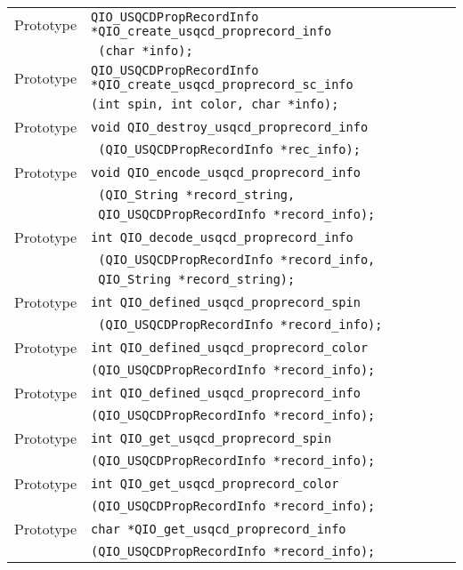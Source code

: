 \documentclass{article}
\begin{document}
\begin{flushleft}
  \begin{tabular}{|l|l|}
  \hline
  Prototype      & \verb|QIO_USQCDPropRecordInfo *QIO_create_usqcd_proprecord_info|\\
                 & \verb| (char *info);|\\
  Prototype      & \verb|QIO_USQCDPropRecordInfo *QIO_create_usqcd_proprecord_sc_info|\\
                 & \verb|(int spin, int color, char *info);|\\
  Prototype      & \verb|void QIO_destroy_usqcd_proprecord_info|\\
               & \verb| (QIO_USQCDPropRecordInfo *rec_info);|\\
Prototype      & \verb|void QIO_encode_usqcd_proprecord_info|\\
               & \verb| (QIO_String *record_string, |\\
               & \verb| QIO_USQCDPropRecordInfo *record_info);|\\
Prototype      & \verb|int QIO_decode_usqcd_proprecord_info|\\
               & \verb| (QIO_USQCDPropRecordInfo *record_info,|\\
               & \verb| QIO_String *record_string);|\\
Prototype      & \verb|int QIO_defined_usqcd_proprecord_spin|\\
               & \verb| (QIO_USQCDPropRecordInfo *record_info);|\\
Prototype      & \verb|int QIO_defined_usqcd_proprecord_color|\\
               & \verb|(QIO_USQCDPropRecordInfo *record_info);|\\
Prototype      & \verb|int QIO_defined_usqcd_proprecord_info|\\
               & \verb|(QIO_USQCDPropRecordInfo *record_info);|\\
Prototype      & \verb|int QIO_get_usqcd_proprecord_spin|\\
               & \verb|(QIO_USQCDPropRecordInfo *record_info);|\\
Prototype      & \verb|int QIO_get_usqcd_proprecord_color|\\
               & \verb|(QIO_USQCDPropRecordInfo *record_info);|\\
Prototype      & \verb|char *QIO_get_usqcd_proprecord_info|\\
               & \verb|(QIO_USQCDPropRecordInfo *record_info);|\\
  \hline
 \end{tabular}
\end{flushleft}
%
\end{document}

